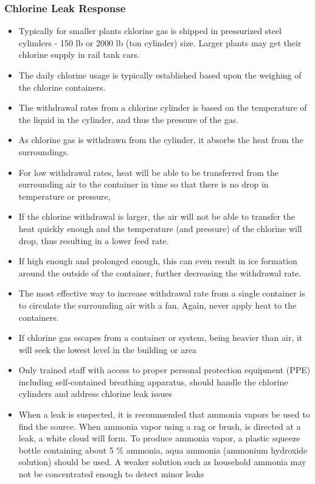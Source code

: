 \subsubsection{Chlorine Leak Response}
\begin{itemize}
	\item Typically for smaller plants chlorine gas is shipped in  pressurized steel cylinders - 150 lb or 2000 lb (ton cylinder) size.  Larger plants may get their chlorine supply in rail tank cars.  
	\item The daily chlorine usage is typically established based upon the weighing of the chlorine containers.
	\item The withdrawal rates from a chlorine cylinder is based on the temperature of the liquid in the cylinder, and thus the pressure of the gas. 
	\item As chlorine gas is withdrawn from the cylinder, it absorbs the heat from the surroundings.
	\item For low withdrawal rates, heat will be able to be transferred from the surrounding air to the container in time so that there is no drop in temperature or pressure, 
	\item If the chlorine withdrawal is larger, the air will not be able to transfer the heat quickly enough and the temperature (and pressure) of the chlorine will drop, thus resulting in a lower feed rate. 
	\item If high enough and prolonged enough, this can even result in ice formation around the outside of the container, further decreasing the withdrawal rate. 
	\item The most effective way to increase withdrawal rate from a single container is to circulate the surrounding air with a fan. Again, never apply heat to the containers.
	\item If chlorine gas escapes from a container or system, being heavier than air, it will seek the lowest level in the building or area
	\item Only trained staff with access to proper personal protection equipment (PPE) including self-contained breathing apparatus, should handle the chlorine cylinders and address chlorine leak issues 
	\item When a leak is suspected, it is recommended that ammonia vapors be used to find the source. When ammonia vapor using a rag or brush, is directed at a leak, a white cloud will form. To produce ammonia vapor, a plastic squeeze bottle containing about 5 \% ammonia, aqua ammonia (ammonium hydroxide solution) should be used. A weaker solution such as household ammonia may not be concentrated enough to detect minor leaks

\end{itemize}
